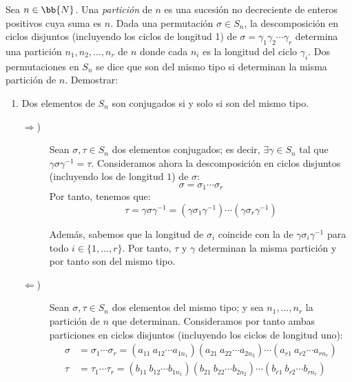 \begin{ejercicio}\label{ej:6.9}
    Sea $n\in \bb{N}$. Una \emph{partición} de $n$ es una sucesión no decreciente de enteros positivos cuya suma es $n$. Dada una permutación $\sigma \in S_n$, la descomposición en ciclos disjuntos (incluyendo los ciclos de longitud 1) de $\sigma = \gamma_1 \gamma_2 \cdots \gamma_r$ determina una partición $n_1, n_2, \ldots, n_r$ de $n$ donde cada $n_i$ es la longitud del ciclo $\gamma_i$. Dos permutaciones en $S_n$ se dice que son del mismo tipo si determinan la misma partición de $n$. Demostrar:
    \begin{enumerate}
        \item Dos elementos de $S_n$ son conjugados si y solo si son del mismo tipo.
        \begin{description}
            \item[$\Longrightarrow$)] Sean $\sigma,\tau\in S_n$ dos elementos conjugados; es decir, $\exists \gamma\in S_n$ tal que $\gamma\sigma\gamma^{-1}=\tau$. Consideramos ahora la descomposición en ciclos disjuntos (incluyendo los de longitud $1$) de $\sigma$:
            \begin{equation*}
                \sigma = \sigma_1\cdots\sigma_r
            \end{equation*}
            Por tanto, tenemos que:
            \begin{equation*}
                \tau=\gamma\sigma\gamma^{-1} = (\gamma\sigma_1\gamma^{-1})\cdots(\gamma\sigma_r\gamma^{-1})
            \end{equation*}

            Además, sabemos que la longitud de $\sigma_i$ coincide con la de $\gamma\sigma_i\gamma^{-1}$ para todo $i\in \{1,\ldots,r\}$. Por tanto, $\tau$ y $\gamma$ determinan la misma partición y por tanto son del mismo tipo.

            \item[$\Longleftarrow$)] Sean $\sigma,\tau\in S_n$ dos elementos del mismo tipo; y sea $n_1,\dots,n_r$ la partición de $n$ que determinan. Consideramos por tanto ambas particiones en ciclos disjuntos (incluyendo los ciclos de longitud uno):
            \begin{align*}
                \sigma &= \sigma_1\cdots\sigma_r
                = (a_{11} \ a_{12} \cdots a_{1n_1})(a_{21} \ a_{22} \cdots a_{2n_2})\cdots(a_{r1} \ a_{r2} \cdots a_{rn_r})\\
                \tau &= \tau_1\cdots\tau_r
                = (b_{11} \ b_{12} \cdots b_{1n_1})(b_{21} \ b_{22} \cdots b_{2n_2})\cdots(b_{r1} \ b_{r2} \cdots b_{rn_r})
            \end{align*}


\end{description}
\end{enumerate}
\end{ejercicio}
